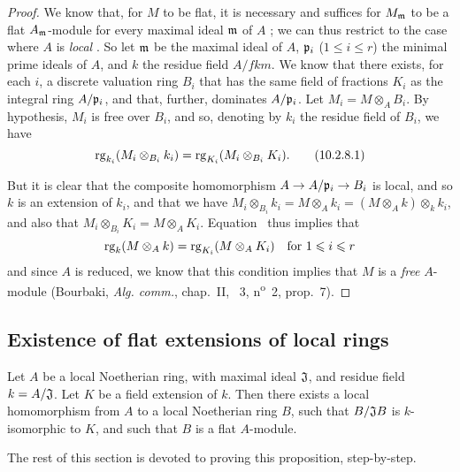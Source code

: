 \begin{proof}
\label{proof-0.10.2.8}
We know that, for $M$ to be flat, it is necessary and suffices for $M_\mathfrak{m}$ to be a flat $A_\mathfrak{m}$-module for every maximal ideal $\mathfrak{m}$ of $A$ ;
we can thus restrict to the case where $A$ is \emph{local} .
So let $\mathfrak{m}$ be the maximal ideal of $A$, $\mathfrak{p}_i$ ($1\leq i\leq r$) the minimal prime ideals of $A$, and $k$ the residue field $A/fk{m}$.
We know  that there exists, for each $i$, a discrete valuation ring $B_i$ that has the same field of fractions $K_i$ as the integral ring $A/\mathfrak{p}_i$, and that, further, dominates $A/\mathfrak{p}_i$.
Let $M_i=M\otimes_A B_i$.
By hypothesis, $M_i$ is free over $B_i$, and so, denoting by $k_i$ the residue field of $B_i$, we have
\[
\label{0.10.2.8.1}
    {\mathop{\mathrm{rg}}\nolimits}_{k_i}(M_i\otimes_{B_i}k_i) = {\mathop{\mathrm{rg}}\nolimits}_{K_i}(M_i\otimes_{B_i}K_i).\tag{10.2.8.1}
\]

But it is clear that the composite homomorphism $A\to A/\fk{p}_i\to B_i$ is local, and so $k$ is an extension of $k_i$, and that we have $M_i\otimes_{B_i}k_i = M\otimes_A k_i = (M\otimes_A k)\otimes_k k_i$, and also that $M_i\otimes_{B_i}K_i = M\otimes_A K_i$.
Equation~ thus implies that
\[
    {\mathop{\mathrm{rg}}\nolimits}_k(M\otimes_A k) = {\mathop{\mathrm{rg}}\nolimits}_{K_i}(M\otimes_A K_i) \quad\mbox{for $1\leqslant i\leqslant r$}
\]
and since $A$ is reduced, we know that this condition implies that $M$ is a \emph{free} $A$-module (Bourbaki, \emph{Alg. comm.}, chap.~II, \textsection~3, n\textsuperscript{o}~2, prop.~7).
\end{proof}

\subsection{Existence of flat extensions of local rings}
\label{subsection:0.10.3}

\begin{prop}[10.3.1]
\label{0.10.3.1}
Let $A$ be a local Noetherian ring, with maximal ideal $\mathfrak{J}$, and residue field $k=A/\mathfrak{J}$.
Let $K$ be a field extension of $k$.
Then there exists a local homomorphism from $A$ to a local Noetherian ring $B$, such that $B/\mathfrak{J}B$ is $k$-isomorphic to $K$, and such that $B$ is a flat $A$-module.
\end{prop}

The rest of this section is devoted to proving this proposition, step-by-step.

